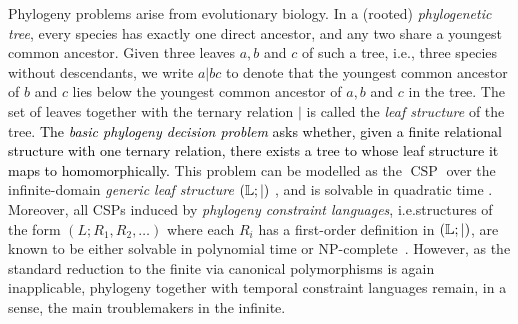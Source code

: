 \documentclass[a4paper,reqno, cleveref]{amsart}
\newcommand{\struct}[1]{\mathbb{#1}}
\DeclareMathOperator{\CSP}{CSP}
\newcommand{\Phylo}[1]{\ensuremath{(\struct{L};|)}#1}
\newcommand{\johanna}[1]{\todo{\textbf{Johanna:} #1}}
\newcommand{\moritz}[1]{\todo{\textbf{Moritz:} #1}}
\newcommand\jo[1]{\textcolor{black}{#1}} %
\begin{document}
 Phylogeny problems arise from evolutionary biology. 
%
In a (rooted)
\emph{phylogenetic tree}, every species has exactly one direct ancestor, and any two share a youngest common ancestor. 
%
%
Given three leaves $a,b$ and $c$ of such a tree, i.e., three species without descendants, we write $a|bc$ to denote that the youngest common ancestor of $b$ and $c$ lies below the youngest common ancestor of $a,b$ and $c$ in the tree.
%
The set of leaves together with the ternary relation $|$ is called the \emph{leaf structure} of the tree. 
%
%
\jo{The \emph{basic phylogeny decision problem} asks whether, given a finite relational structure with one ternary relation, there exists a
tree to whose leaf structure it  maps to homomorphically.}
%
This problem can be modelled as the $\CSP$ over the infinite-domain \emph{generic leaf structure} $\Phylo$ \cite{BodJonsPham}, and is solvable in quadratic time \cite{AhoPhylo81}.
Moreover, all CSPs induced by \emph{phylogeny constraint languages}, i.e.\;structures of the form $(L; R_1, R_2, \dots)$ where each $R_i$ has a first-order definition in $\Phylo$, are known to be either solvable in polynomial time or NP-complete~\cite{BodirskyRootedPhylo}. However, as the standard reduction to the finite via canonical polymorphisms is again inapplicable, phylogeny together with temporal constraint languages remain, in a sense, the main troublemakers in the infinite.  
\end{document}
